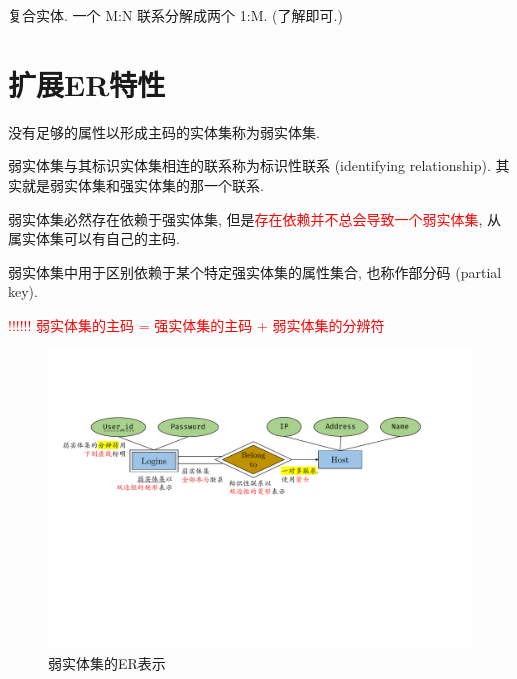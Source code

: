 复合实体. 一个 M:N 联系分解成两个 1:M. (了解即可.)

\section{扩展ER特性}

\begin{definition}
    没有足够的属性以形成主码的实体集称为弱实体集.
\end{definition}

\begin{definition}
    弱实体集与其标识实体集相连的联系称为标识性联系 (identifying relationship). 其实就是弱实体集和强实体集的那一个联系.
\end{definition}

\begin{remark}
    弱实体集必然存在依赖于强实体集, 但是\textcolor{red}{存在依赖并不总会导致一个弱实体集}, 从属实体集可以有自己的主码.
\end{remark}

\begin{definition}
    弱实体集中用于区别依赖于某个特定强实体集的属性集合, 也称作部分码 (partial key).
\end{definition}

\textcolor{red}{!!!!!! 弱实体集的主码 = 强实体集的主码 + 弱实体集的分辨符}

\begin{figure}[H]
    \centering
    \includegraphics[width=\textwidth]{figure/弱实体集.pdf}
    \caption{弱实体集的ER表示}
\end{figure}

